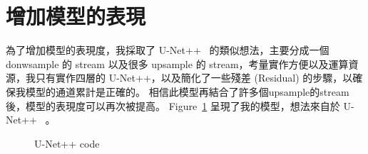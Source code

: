 \documentclass[a4paper,12pt]{article}   %
\begin{document}
\section{增加模型的表現}

	為了增加模型的表現度，我採取了 U-Net++\ \cite{unetplus} 的類似想法，主要分成一個 donwsample 的 stream 以及很多 upsample 的 stream，考量實作方便以及運算資源，我只有實作四層的 U-Net++，以及簡化了一些殘差 (Residual) 的步驟，以確保我模型的通道累計是正確的。 相信此模型再結合了許多個upsample的stream後，模型的表現度可以再次被提高。 Figure\ \ref{fig:unetplus} 呈現了我的模型，想法來自於 U-Net++\ \cite{unetplus} 。

\begin{figure}[H]
  \vspace{0.1\baselineskip}  
  \centering  
    \caption{U-Net++ code}
    \label{fig:unetplus}
  \vspace{0.1\baselineskip}
\end{figure}	





\end{document}
